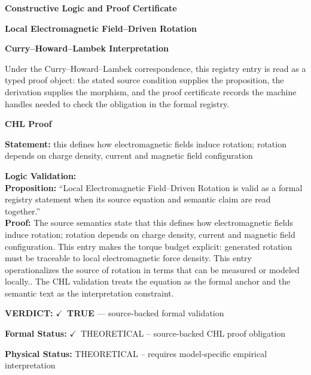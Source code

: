 \clearpage
\begingroup\tzpsupportsetup
\noindent\textbf{\fontsize{10.8pt}{12.8pt}\selectfont [ID 0088] Constructive Logic and Proof Certificate}\par
\noindent\textbf{\fontsize{10pt}{12pt}\selectfont Local Electromagnetic Field--Driven Rotation}\par
\vspace{0.45em}
\begingroup
\footnotesize
\setlength{\parskip}{0.22em}
\setlength{\parindent}{0pt}
\noindent\textbf{Curry--Howard--Lambek Interpretation}\par
Under the Curry--Howard--Lambek correspondence, this registry entry is read as a typed proof
object: the stated source condition supplies the proposition, the derivation supplies the
morphism, and the proof certificate records the machine handles needed to check the obligation
in the formal registry.

\vspace{0.45em}
\noindent\textbf{CHL Proof}\par
\textbf{Statement:} this defines how electromagnetic fields induce rotation; rotation depends on charge
density, current and magnetic field configuration

\textbf{Logic Validation:}\\
\textbf{Proposition:} ``Local Electromagnetic Field--Driven Rotation is valid as a formal registry statement
when its source equation and semantic claim are read together.''\\
\textbf{Proof:} The source semantics state that this defines how electromagnetic fields induce rotation;
rotation depends on charge density, current and magnetic field configuration. This entry
makes the torque budget explicit: generated rotation must be traceable to local
electromagnetic force density. This entry operationalizes the source of rotation in
terms that can be measured or modeled locally.. The CHL validation treats the equation
as the formal anchor and the semantic text as the interpretation constraint.

\textbf{VERDICT:} \ensuremath{\checkmark}\ \textbf{TRUE} --- source-backed formal validation

\textbf{Formal Status:} \ensuremath{\checkmark}\ THEORETICAL -- source-backed CHL proof obligation

\textbf{Physical Status:} THEORETICAL -- requires model-specific empirical interpretation
\par\vspace{0.45em}
\par
\ifTZPDarkEdition
{}
\fi
\endgroup
\endgroup
